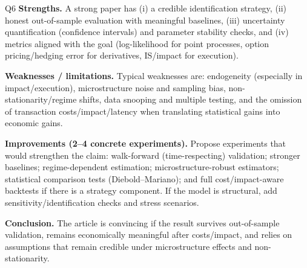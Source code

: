 \begin{solutionbox}{Q6}
\medskip
\textbf{Strengths.} A strong paper has (i) a credible identification strategy, (ii) honest out-of-sample evaluation with meaningful baselines, (iii) uncertainty quantification (confidence intervals) and parameter stability checks, and (iv) metrics aligned with the goal (log-likelihood for point processes, option pricing/hedging error for derivatives, IS/impact for execution).

\medskip
\textbf{Weaknesses / limitations.} Typical weaknesses are: endogeneity (especially in impact/execution), microstructure noise and sampling bias, non-stationarity/regime shifts, data snooping and multiple testing, and the omission of transaction costs/impact/latency when translating statistical gains into economic gains.

\medskip
\textbf{Improvements (2--4 concrete experiments).} Propose experiments that would strengthen the claim: walk-forward (time-respecting) validation; stronger baselines; regime-dependent estimation; microstructure-robust estimators; statistical comparison tests (Diebold--Mariano); and full cost/impact-aware backtests if there is a strategy component. If the model is structural, add sensitivity/identification checks and stress scenarios.

\medskip
\textbf{Conclusion.} The article is convincing if the result survives out-of-sample validation, remains economically meaningful after costs/impact, and relies on assumptions that remain credible under microstructure effects and non-stationarity.
\end{solutionbox}

